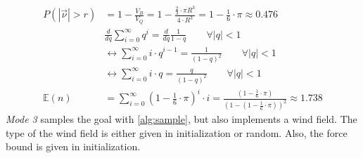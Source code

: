 \begin{align}
	P(|\overrightarrow{\nu}| > r) &= 1 - \frac{V_{B}}{V_Q} = 1 - \frac{\frac{2}{3} \cdot \pi R^3}{4 \cdot R^3} = 1 - \frac{1}{6} \cdot \pi \approx 0.476 \label{eq:prob}\\
	&\frac{d}{dq} \sum_{i=0}^{\infty} q^i = \frac{d}{dq} \frac{1}{1 - q} \qquad \forall |q| < 1\nonumber\\
	&\leftrightarrow \sum_{i=0}^{\infty} i \cdot q^{i-1} = \frac{1}{(1-q)^2} \qquad \forall |q| < 1 \nonumber\\
	&\leftrightarrow \sum_{i=0}^{\infty} i \cdot q = \frac{q}{(1 - q)^2} \qquad \forall |q| < 1 \\
	\mathbb{E}(n) &= \sum_{i = 0}^{\infty} (1 - \frac{1}{6} \cdot \pi)^i \cdot i  = \frac{ (1 - \frac{1}{6} \cdot \pi)}{(1 -  (1 - \frac{1}{6} \cdot \pi))^2}\approx 1.738 \label{eq:expn}
\end{align}
\emph{Mode 3} samples the goal with \cref{alg:sample}, but also implements a wind field. 
The type of the wind field is either given in initialization or random. Also, the force bound is given in initialization. 
\newpage

